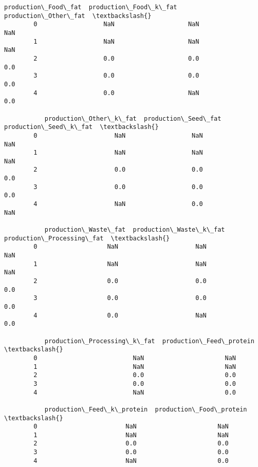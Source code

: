 \documentclass[11pt]{article}
\begin{document}
\begin{Verbatim}[commandchars=\\\{\}]
           production\_Food\_fat  production\_Food\_k\_fat  production\_Other\_fat  \textbackslash{}
        0                  NaN                    NaN                   NaN   
        1                  NaN                    NaN                   NaN   
        2                  0.0                    0.0                   0.0   
        3                  0.0                    0.0                   0.0   
        4                  0.0                    NaN                   0.0   
        
           production\_Other\_k\_fat  production\_Seed\_fat  production\_Seed\_k\_fat  \textbackslash{}
        0                     NaN                  NaN                    NaN   
        1                     NaN                  NaN                    NaN   
        2                     0.0                  0.0                    0.0   
        3                     0.0                  0.0                    0.0   
        4                     NaN                  0.0                    NaN   
        
           production\_Waste\_fat  production\_Waste\_k\_fat  production\_Processing\_fat  \textbackslash{}
        0                   NaN                     NaN                        NaN   
        1                   NaN                     NaN                        NaN   
        2                   0.0                     0.0                        0.0   
        3                   0.0                     0.0                        0.0   
        4                   0.0                     NaN                        0.0   
        
           production\_Processing\_k\_fat  production\_Feed\_protein  \textbackslash{}
        0                          NaN                      NaN   
        1                          NaN                      NaN   
        2                          0.0                      0.0   
        3                          0.0                      0.0   
        4                          NaN                      0.0   
        
           production\_Feed\_k\_protein  production\_Food\_protein  \textbackslash{}
        0                        NaN                      NaN   
        1                        NaN                      NaN   
        2                        0.0                      0.0   
        3                        0.0                      0.0   
        4                        NaN                      0.0   
        

\end{Verbatim}
\end{document}
